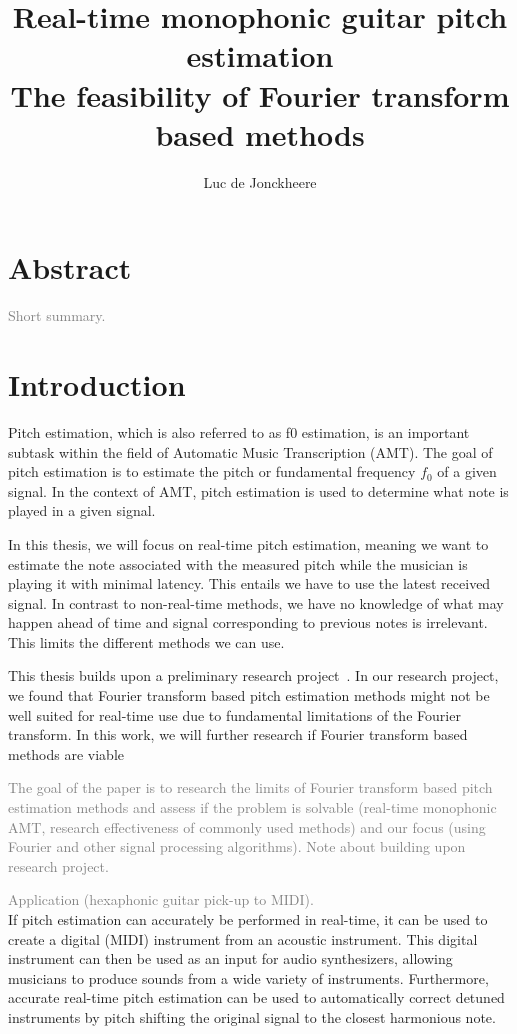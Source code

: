 \documentclass[10pt,twocolumn]{article}
\title{\textbf{Real-time monophonic guitar pitch estimation}\\The feasibility of Fourier transform based methods}
\author{Luc de Jonckheere}
\begin{document}

\maketitle


\section*{Abstract}
\textcolor{gray}{Short summary.}


\section{Introduction}
Pitch estimation, which is also referred to as f0 estimation, is an important subtask within the field of Automatic Music Transcription (AMT). The goal of pitch estimation is to estimate the pitch or fundamental frequency $f_0$ of a given signal. In the context of AMT, pitch estimation is used to determine what note is played in a given signal.

In this thesis, we will focus on real-time pitch estimation, meaning we want to estimate the note associated with the measured pitch while the musician is playing it with minimal latency. This entails we have to use the latest received signal. In contrast to non-real-time methods, we have no knowledge of what may happen ahead of time and signal corresponding to previous notes is irrelevant. This limits the different methods we can use.


This thesis builds upon a preliminary research project~\cite{ik}. In our research project, we found that Fourier transform based pitch estimation methods might not be well suited for real-time use due to fundamental limitations of the Fourier transform. In this work, we will further research if Fourier transform based methods are viable

\textcolor{gray}{The goal of the paper is to research the limits of Fourier transform based pitch estimation methods and assess if the problem is solvable (real-time monophonic AMT, research effectiveness of commonly used methods) and our focus (using Fourier and other signal processing algorithms). Note about building upon research project.}

\textcolor{gray}{Application (hexaphonic guitar pick-up to MIDI).}\\
If pitch estimation can accurately be performed in real-time, it can be used to create a digital (MIDI) instrument from an acoustic instrument. This digital instrument can then be used as an input for audio synthesizers, allowing musicians to produce sounds from a wide variety of instruments. Furthermore, accurate real-time pitch estimation can be used to automatically correct detuned instruments by pitch shifting the original signal to the closest harmonious note.
\end{document}
